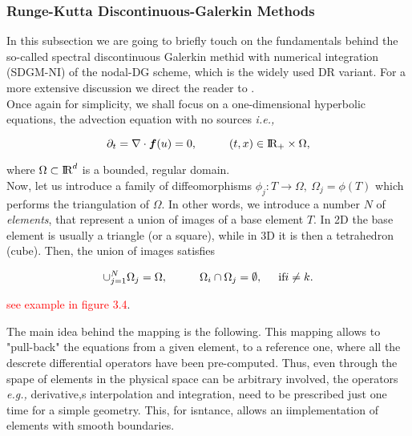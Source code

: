 \documentclass[11pt,a4paper,headinclude=true,DIV=14,BCOR=8mm,chapterprefix,listof=totoc,twoside,openright,abstracton]{scrbook}
\begin{document}
\subsubsection{Runge-Kutta Discontinuous-Galerkin Methods}

In this subsection we are going to briefly touch on the fundamentals behind the so-called spectral discontinuous Galerkin methid with numerical integration (SDGM-NI) of the nodal-DG scheme, which is the widely used DR variant. For a more extensive discussion we direct the reader to \cite{Hesthaven:2007}. \\

Once again for simplicity, we shall focus on a one-dimensional hyperbolic equations, the advection equation with no sources \textit{i.e.,}

\begin{equation}
    \partial_t = \nabla\cdot\boldsymbol{f}(u) =0, \hspace{10mm} (t,x)\in \text{I\!R}_{+} \times\Omega,
    \label{eq:theory:dg:adveq}
\end{equation}

where $\Omega\subset \text{I\!R}^{d}$ is a bounded, regular domain. \\

Now, let us introduce a family of diffeomorphisms $\phi_{j}: T\rightarrow\Omega,\:\Omega_{j}=\phi(T)$ which performs the triangulation of $\Omega$. In other words, we introduce a number $N$ of \textit{elements}, that represent a union of images of a base element $T$. In 2D the base element is usually a triangle (or a square), while in 3D it is then a tetrahedron (cube). Then, the union of images satisfies

\begin{equation}
    \cup_{j=1}^{N}\Omega_{j} = \Omega, \hspace{10mm} \Omega_{i}\cap\Omega_{j} = \emptyset, \hspace{5mm} \text{if} i\neq k.
\end{equation}

\textcolor{red}{see example in figure 3.4}. 

The main idea behind the mapping is the following. This mapping allows to "pull-back" the equations from a given element, to a reference one, where all the descrete differential operators have been pre-computed. Thus, even through the spape of elements in the physical space can be arbitrary involved, the operators \textit{e.g.,} derivative,s interpolation and integration, need to be prescribed just one time for a simple geometry. This, for isntance, allows an iimplementation of elements with smooth boundaries. \\
\end{document}
